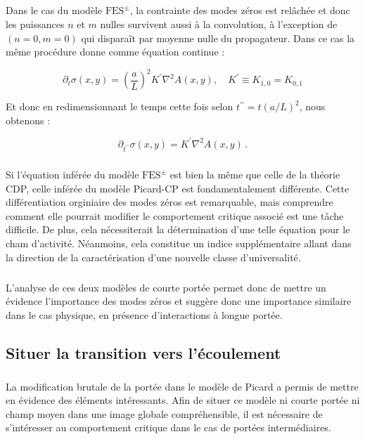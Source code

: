 \subparagraph{}Dans le cas du modèle $\text{FES}^\pm$, la contrainte des modes zéros est relâchée et donc les puissances $n$ et $m$ nulles survivent aussi à la convolution, à l'exception de $(n=0,m=0)$ qui disparaît par moyenne nulle du propagateur. Dans ce cas la même procédure donne comme équation continue : 

\begin{equation}
    \partial_t\sigma (x,y) = \left( \frac{a}{L} \right)^{2}K^\prime\nabla^2 A(x, y), \quad K^\prime \equiv K_{1,0} = K_{0,1}
    \label{eq:evol:sigma:CDP:raw}
\end{equation}

\noindent Et donc en redimensionnant le temps cette fois selon $t^{\prime\prime}=t(a/L)^2$, nous obtenons :

\begin{equation}
    \partial_{t^{\prime\prime}}\sigma (x,y) = K^\prime\nabla^2 A(x, y)\, .
    \label{eq:evol:sigma:CDP}
\end{equation}

\subparagraph{}Si l'équation inférée du modèle $\text{FES}^\pm$ est bien la même que celle de la théorie CDP, celle inférée du modèle Picard-CP est fondamentalement différente. Cette différentiation orginiaire des modes zéros est remarquable, mais comprendre comment elle pourrait modifier le comportement critique associé est une tâche difficile. De plus, cela nécessiterait la détermination d'une telle équation pour le cham d'activité. Néanmoins, cela constitue un indice supplémentaire allant dans la direction de la caractérisation d'une nouvelle classe d'universalité.

\subparagraph{}L'analyse de ces deux modèles de courte portée permet donc de mettre un évidence l'importance des modes zéros et suggère donc une importance similaire dans le cas physique, en présence d'interactions à longue portée.

\subsection{Situer la transition vers l'écoulement}

\label{sec:alphaPicard}

\subparagraph{}La modification brutale de la portée dans le modèle de Picard a permis de mettre en évidence des éléments intéressants. Afin de situer ce modèle ni courte portée ni champ moyen dans une image globale compréhensible, il est nécessaire de s'intéresser au comportement critique dans le cas de portées intermédiaires. 

